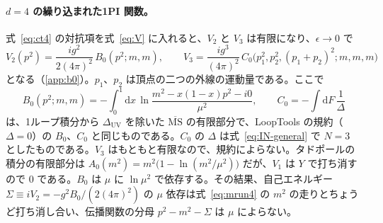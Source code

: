 \documentclass[a4paper,10pt]{ltjsarticle}
\newcommand{\dd}{\mathrm{d}}
\begin{document}
\paragraph{$d=4$ の繰り込まれた1PI 関数。}式~\eqref{eq:ct4} の対抗項を式~\eqref{eq:V} に入れると、$V_2$ と $V_3$ は有限になり、$\epsilon\to0$ で
\begin{equation}
V_2(p^2)=\frac{ig^2}{2(4\pi)^2}\,B_0(p^2;m,m),\qquad
V_3=\frac{ig^3}{(4\pi)^2}\,C_0\bigl(p_1^2,p_2^2,(p_1+p_2)^2;m,m,m\bigr)
\label{eq:VR4}
\end{equation}
となる（\ref{app:b0}）。$p_1$、$p_2$ は頂点の二つの外線の運動量である。ここで
\begin{equation}
B_0(p^2;m,m)=-\int_0^1\dd x\,\ln\frac{m^2-x(1-x)p^2-i0}{\mu^2},\qquad
C_0=-\int\!\dd F\,\frac{1}{\Delta}
\label{eq:B0C0}
\end{equation}
は、1ループ積分から $\Delta_{\mathrm{UV}}$ を除いた $\overline{\mathrm{MS}}$ の有限部分で、LoopTools の規約（$\Delta=0$）の $B_0$、$C_0$ と同じものである。$C_0$ の $\Delta$ は式~\eqref{eq:IN-general} で $N=3$ としたものである。$V_3$ はもともと有限なので、規約によらない。タドポールの積分の有限部分は $A_0(m^2)=m^2\bigl(1-\ln(m^2/\mu^2)\bigr)$ だが、$V_1$ は $Y$ で打ち消すので $0$ である。$B_0$ は $\mu$ に $\ln\mu^2$ で依存する。その結果、自己エネルギー $\Sigma\equiv iV_2=-g^2B_0/(2(4\pi)^2)$ の $\mu$ 依存は式~\eqref{eq:mrun4} の $m^2$ の走りとちょうど打ち消し合い、伝播関数の分母 $p^2-m^2-\Sigma$ は $\mu$ によらない。
\end{document}
